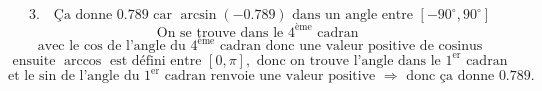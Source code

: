 \documentclass{article}
\begin{document}
\[
\text{3.} \quad \text{Ça donne } 0.789 \text{ car } \arcsin(-0.789) \text{ dans un angle entre } [-90^\circ, 90^\circ]
\]
\[
\text{On se trouve dans le } 4^\text{ème} \text{ cadran }
\]
\[
\text{avec le cos de l'angle du } 4^\text{ème} \text{ cadran donc une valeur positive de cosinus}
\]
\[
\text{ensuite } \arccos \text{ est défini entre } [0, \pi], \text{ donc on trouve l'angle dans le } 1^\text{er} \text{ cadran}
\]
\[
\text{et le sin de l'angle du } 1^\text{er} \text{ cadran renvoie une valeur positive } \Rightarrow \text{ donc ça donne } 0.789.
\]
\end{document}
